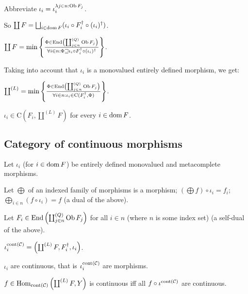 Abbreviate $\iota_i = \iota^{\lambda j \in n : \operatorname{Ob} F_j}_i$.

So $\coprod F = \bigsqcup_{i \in \dom F} (\iota_i \circ F_i^{\dagger}
\circ (\iota_i)^{\dagger})$.

$\coprod F = \min \left\{ \frac{ \Phi \in \operatorname{End} \left( \coprod^{(Q)}_{j \in n}
\operatorname{Ob} F_j \right) }{ \forall i \in n : \Phi
\sqsupseteq \iota_i \circ F_i^{\dagger} \circ (\iota_i)^{\dagger} }\right\}$.

Taking into account that $\iota_i$ is a monovalued entirely defined morphism,
we get:

\begin{obvious}
$\coprod^{(L)} = \min \left\{ \frac{ \Phi \in \operatorname{End} \left( \coprod^{(Q)}_{j \in
n} \operatorname{Ob} F_j \right) }{ \forall i \in n : \iota_i
\in \mathrm{C} (F_i^{\dagger} , \Phi) }\right\}$.{\hspace*{\fill}}{\medskip}
\end{obvious}

\begin{cor}
  $\iota_i \in \mathrm{C} \left( F_i , \coprod^{(L)} F \right)$ for every $i
  \in \operatorname{dom} F$.
\end{cor}

\subsection{Category of continuous morphisms}

Let $\iota_i$ (for $i \in \operatorname{dom} F$) be entirely defined monovalued and
metacomplete morphisms.

Let $\bigoplus$ of an indexed family of morphisms is a morphism; $\left(
\bigoplus f \right) \circ \iota_i = f_i$; $\bigoplus_{i \in n} (f \circ
\iota_i) = f$ (a dual of the above).

Let $F_i \in \operatorname{End} \left( \coprod^{(Q)}_{j \in n} \operatorname{Ob} F_j \right)$
for all $i \in n$ (where $n$ is some index set) (a self-dual of the above).

\begin{defn}
  $\iota^{\operatorname{cont} (\mathcal{C})}_i = \left( \coprod^{(L)} F ,
  F_i^{\dagger} , \iota_i \right)$.
\end{defn}

\begin{prop}
  $\iota_i$ are continuous, that is $\iota^{\operatorname{cont}
  (\mathcal{C})}_i$ are morphisms.
\end{prop}

\begin{lem}
  $f \in \operatorname{Hom}_{\operatorname{cont} (\mathcal{C})} \left(
  \coprod^{(L)} F , Y \right)$  is continuous iff all $f \circ
  \iota^{\operatorname{cont} (\mathcal{C})}$ are continuous.
\end{lem}

